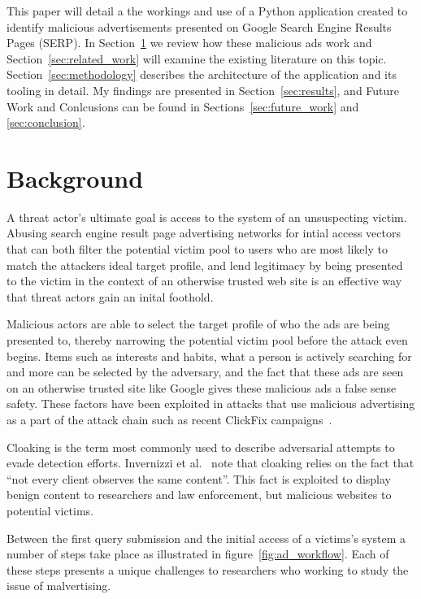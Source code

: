 \documentclass[sigconf]{acmart}
\begin{document}
This paper will detail a the workings and use of a Python application created to
identify malicious advertisements presented on Google Search Engine Results
Pages (SERP).
In Section~\ref{sec:background} we review how these malicious ads work and
Section~\ref{sec:related_work} will examine the existing literature on this
topic. Section~\ref{sec:methodology} describes the architecture of the
application and its tooling in detail.
My findings are presented in Section~\ref{sec:results}, and Future Work and
Conlcusions can be found in Sections~\ref{sec:future_work}
and \ref{sec:conclusion}.

\section{Background}
\label{sec:background}
A threat actor's ultimate goal is access to the system of an unsuspecting
victim.
Abusing search engine result page advertising networks for intial access
vectors that can both filter the potential victim pool to
users who are most likely to match the attackers ideal target profile, and lend
legitimacy by being presented to the victim in the context of an otherwise
trusted web site is an effective way that threat actors gain an inital foothold.

Malicious actors are able to  select the target profile of who the ads are being
presented to, thereby narrowing the potential victim pool before the attack even
begins.
Items such as interests and habits, what a person is actively searching for and
more can be selected by the adversary\cite{google_2026_ad_docs}, and the fact
that these ads are seen on an otherwise trusted site like Google gives these
malicious ads a false sense safety.
These factors have been exploited in attacks that use malicious
advertising as a part of the attack chain such as recent ClickFix campaigns~\cite{huntress_2026_evolving_clickfix}. 

Cloaking is the term most commonly used to describe adversarial attempts to
evade detection efforts.
Invernizzi et al.~\cite{invernizzi_2016_cloak} note that cloaking relies on the
fact that ``not every client observes the same content''.
This fact is exploited to display benign content to researchers and law
enforcement, but malicious websites to potential victims.

Between the first query submission and the initial access of a victims's system
a number of steps take place as illustrated in figure~\ref{fig:ad_workflow}.
Each of these steps presents a unique challenges to researchers who working to
study the issue of malvertising.
\end{document}
